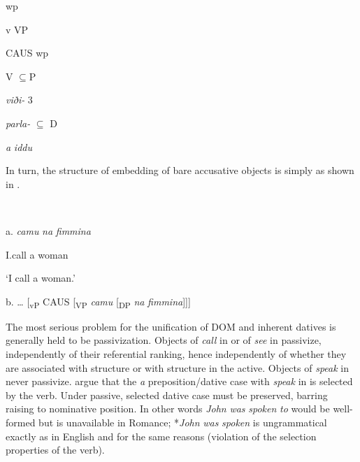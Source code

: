 \documentclass[output=paper]{langscibook}
\begin{document}
    wp



    v               VP    



     CAUS    wp



        V          ${\subseteq}$P



\textit{viði-}    3



        \textit{parla-}    ${\subseteq}$      D      


            \textit{a}      \textit{iddu}    

  In turn, the structure of embedding of bare accusative objects is simply as shown in . 

\ea\label{ex:key:}
{}\\
\z

a.  \textit{camu} \textit{na} \textit{fimmina}



  I.call a woman



  ‘I call a woman.’             


  b.  … [\textsubscript{vP} CAUS  [\textsubscript{VP} \textit{camu} [\textsubscript{DP} \textit{na} \textit{fimmina}]]]

The most serious problem for the unification of DOM and inherent datives is generally held to be passivization. Objects of \textit{call} in  or of \textit{see} in  passivize, independently of their referential ranking, hence independently of whether they are associated with structure  or with structure  in the active. Objects of \textit{speak} in  never passivize. \citet{ManziniFranco2016} argue that the \textit{a} preposition/dative case with \textit{speak} in  is selected by the verb. Under passive, selected dative case must be preserved, barring raising to nominative position. In other words \textit{John} \textit{was} \textit{spoken} \textit{to} would be well-formed but is unavailable in Romance; *\textit{John} \textit{was} \textit{spoken} is ungrammatical exactly as in English and for the same reasons (violation of the selection properties of the verb).
\end{document}
